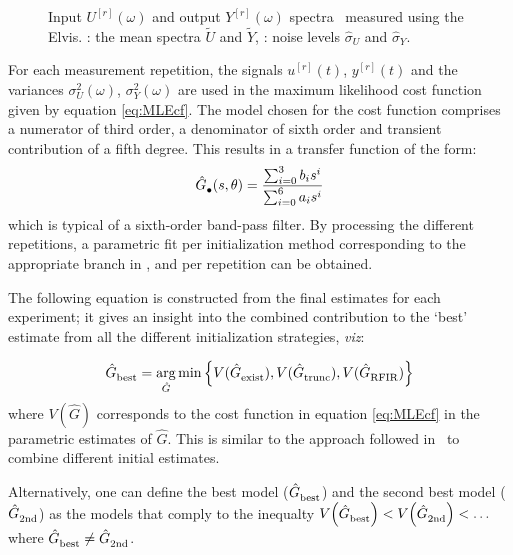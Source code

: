 \begin{figure}
  \centering
  \setlength{\figurewidth}{0.75\columnwidth}
  \setlength{\figureheight}{0.68\figurewidth}
  
  \caption[Measured input/output spectra of \BK{} filter.]{Input $U^{[r]}(\omega)$ and output $Y^{[r]}(\omega)$ spectra~ measured using the Elvis.
  : the mean spectra $\tilde{U}$ and $\tilde{Y}$, : noise levels $\hat\sigma_U$ and $\hat\sigma_Y$.}
  \label{fig:SpectraMeasurement}
\end{figure}

For each measurement repetition, the signals $u^{[r]}(t)$, $y^{[r]}(t)$ and the variances $\sigma_U^2(\omega)$, $\sigma_Y^2(\omega)$ are used in the maximum likelihood cost function given by equation \eqref{eq:MLEcf}.
The model chosen for the cost function comprises a numerator of third order, a denominator of sixth order and transient contribution of a fifth degree. This results in a transfer function of the form:
\begin{equation}
  \hat{G}_{\mathrm{\bullet}}^{\mathrm{}}(s,\theta) = \frac{\sum_{i=0}^3 b_i s^i}{\sum_{i=0}^6 a_i s^i}
\end{equation}
which is typical of a sixth-order band-pass filter.
By processing the different repetitions, a parametric fit per initialization method corresponding to the appropriate branch in , and per repetition can be obtained. 


The following equation is constructed from the final estimates for each experiment; it gives an insight into the combined contribution to the `best' estimate from all the different initialization strategies, \emph{viz}:

\begin{equation}\label{eq:selectBest}
  \hat{G}_{\mathrm{best}}^{\mathrm{}} = 
    \operatorname*{arg}_{\hat{G}} 
    \min 
    \left\{ 
      V(\hat{G}_{\mathrm{exist}}^{\mathrm{}}),
      V(\hat{G}_{\mathrm{trunc}}^{\mathrm{}}),
      V(\hat{G}_{\mathrm{RFIR}}^{\mathrm{}})
    \right\}
\end{equation}
where $V(\hat{G})$ corresponds to the cost function in equation \eqref{eq:MLEcf} in the parametric estimates of $\hat{G}$.
This is similar to the approach followed in~\citep{FDIDENT} to combine different initial estimates.

Alternatively, one can define the best model ($\hat{G}_{\mathrm{best}}^{\mathrm{}}$) and the second best model ($\hat{G}_{\mathrm{2nd}}^{\mathrm{}}$) as the models that comply to the inequalty
$
  V_{}\left(\hat{G}_{\mathrm{best}}^{\mathrm{}}\right) < 
  V_{}\left( \hat{G}_{\mathrm{2nd}}^{\mathrm{}} \right) < 
  \ldots
$
where $\hat{G}_{\mathrm{best}}^{\mathrm{}} \neq \hat{G}_{\mathrm{2nd}}^{\mathrm{}}$.

